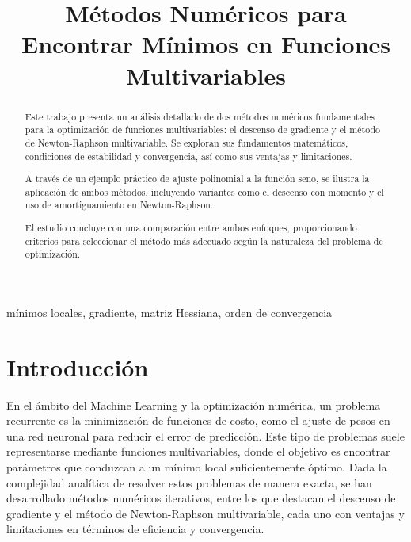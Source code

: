 \documentclass[conference]{IEEEtran}
\begin{document}
\title{Métodos Numéricos para Encontrar Mínimos en Funciones Multivariables}

\author{
\and
{}
\and
{}
}

\maketitle

\begin{abstract}
Este trabajo presenta un análisis detallado de dos métodos numéricos fundamentales para la optimización de funciones multivariables: el descenso de gradiente y el método de Newton-Raphson multivariable. Se exploran sus fundamentos matemáticos, condiciones de estabilidad y convergencia, así como sus ventajas y limitaciones. 

A través de un ejemplo práctico de ajuste polinomial a la función seno, se ilustra la aplicación de ambos métodos, incluyendo variantes como el descenso con momento y el uso de amortiguamiento en Newton-Raphson. 

El estudio concluye con una comparación entre ambos enfoques, proporcionando criterios para seleccionar el método más adecuado según la naturaleza del problema de optimización.
\end{abstract}

\begin{IEEEkeywords}
mínimos locales, gradiente, matriz Hessiana, orden de convergencia
\end{IEEEkeywords}

\section{Introducción}
En el ámbito del Machine Learning y la optimización numérica, un problema recurrente es la minimización de funciones de costo, como el ajuste de pesos en una red neuronal para reducir el error de predicción. Este tipo de problemas suele representarse mediante funciones multivariables, donde el objetivo es encontrar parámetros que conduzcan a un mínimo local suficientemente óptimo. Dada la complejidad analítica de resolver estos problemas de manera exacta, se han desarrollado métodos numéricos iterativos, entre los que destacan el descenso de gradiente y el método de Newton-Raphson multivariable, cada uno con ventajas y limitaciones en términos de eficiencia y convergencia.
\end{document}
